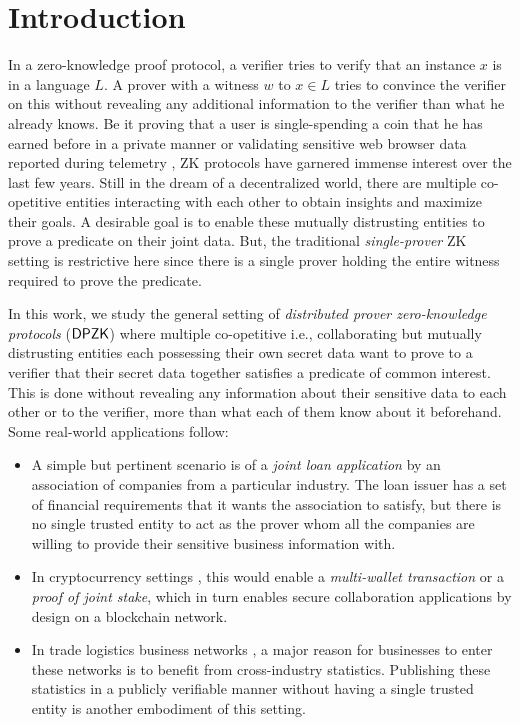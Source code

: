 \section{Introduction} \label{sec:intro}
In a zero-knowledge proof protocol, a verifier tries to verify that an instance $x$ is in a language $L$. A prover with a witness $w$ to $x \in L$ tries to convince the verifier on this without revealing any additional information to the verifier than what he already knows. Be it proving that a user is single-spending a coin that he has earned before in a private manner \cite{zerocash} or validating sensitive web browser data reported during telemetry \cite{MozillaPrio}, ZK protocols have garnered immense interest over the last few years. Still in the dream of a decentralized world, there are multiple co-opetitive entities interacting with each other to obtain insights and maximize their goals. A desirable goal is to enable these mutually distrusting entities to prove a predicate on their joint data. But, the traditional \textit{single-prover} ZK setting is restrictive here since there is a single prover holding the entire witness required to prove the predicate. 


In this work, we study the general setting of \textit{distributed prover zero-knowledge protocols} ($\mathsf{DPZK}$) where multiple co-opetitive i.e., collaborating but mutually distrusting entities each possessing their own secret data want to prove to a verifier that their secret data together satisfies a predicate of common interest. This is done without revealing any information about their sensitive data to each other or to the verifier, more than what each of them know about it beforehand. Some real-world applications follow:
\begin{itemize}
\item A simple but pertinent scenario is of a \textit{joint loan application} by an association of companies from a particular industry. The loan issuer has a set of financial requirements that it wants the association to satisfy, but there is no single trusted entity to act as the prover whom all the companies are willing to provide their sensitive business information with.
\item In cryptocurrency settings \cite{bitcoin, ethereum, zcash}, this would enable a \textit{multi-wallet transaction} or a \textit{proof of joint stake}, which in turn enables secure collaboration applications by design on a blockchain network. %
\item In trade logistics business networks \cite{scbn, e2open, tradelens}, a major reason for businesses to enter these networks is to benefit from cross-industry statistics. Publishing these statistics in a publicly verifiable manner without having a single trusted entity is another embodiment of this setting.
\end{itemize}

